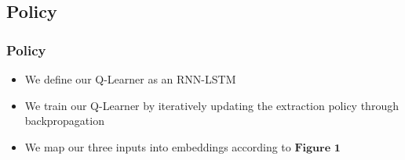 \documentclass[]{beamer}
\begin{document}

	\subsection{Policy}
	\begin{frame}
			\frametitle{Policy}
			\begin{itemize}
				\item<1-> We define our Q-Learner as an RNN-LSTM 
				\item<1->We train our Q-Learner by iteratively updating the extraction policy through backpropagation
				\item<1-> We map our three inputs into embeddings according to $\textbf{Figure 1}$
			\end{itemize}
	\end{frame}
\end{document}
